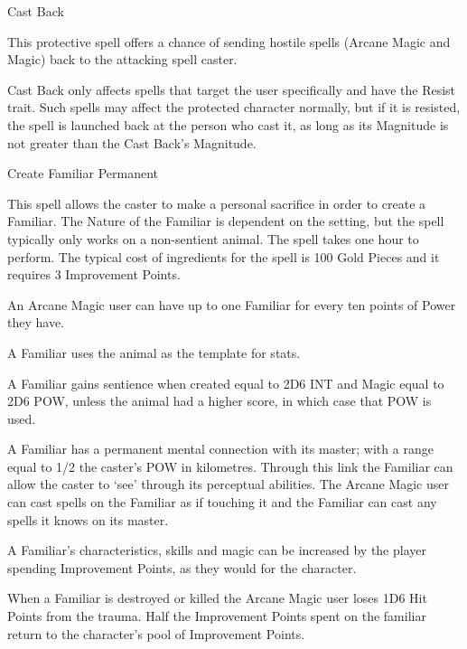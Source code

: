 \begin{rpg-spell}
{Cast Back}
{}

This protective spell offers a chance of sending hostile spells (Arcane Magic and Magic) back to the attacking spell caster. 

Cast Back only affects spells that target the user specifically and have the Resist trait. Such spells may affect the protected character normally, but if it is resisted, the spell is launched back at the person who cast it, as long as its Magnitude is not greater than the Cast Back’s Magnitude. 
\end{rpg-spell}



\begin{rpg-spell}
{Create Familiar}
{Permanent}

This spell allows the caster to make a personal sacrifice in order to create a Familiar. The Nature of the Familiar is dependent on the setting, but the spell typically only works on a non-sentient animal. The spell takes one hour to perform. The typical cost of ingredients for the spell is 100 Gold Pieces and it requires 3 Improvement Points. 

\begin{rpg-list}
\item An Arcane Magic user can have up to one Familiar for every ten points of Power they have.
\item A Familiar uses the animal as the template for stats.
\item A Familiar gains sentience when created equal to 2D6 INT and Magic equal to 2D6 POW, unless the animal had a higher score, in which case that POW is used. 
\item A Familiar has a permanent mental connection with its master; with a range equal to 1/2 the caster’s POW in kilometres. Through this link the Familiar can allow the caster to ‘see’ through its perceptual abilities. The Arcane Magic user can cast spells on the Familiar as if touching it and the Familiar can cast any spells it knows on its master.
\item A Familiar's characteristics, skills and magic can be increased by the player spending Improvement Points, as they would for the character.
\item When a Familiar is destroyed or killed the Arcane Magic user loses 1D6 Hit Points from the trauma. Half the Improvement Points spent on the familiar return to the character's pool of Improvement Points.
\end{rpg-list}

\end{rpg-spell}


